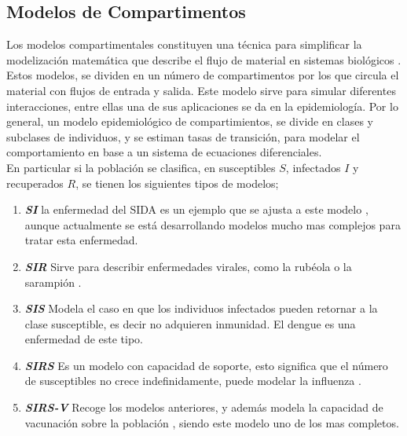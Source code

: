 \documentclass[journal]{IEEEtran}
\begin{document}
\subsection{Modelos de Compartimentos}\label{Modelos}
Los modelos compartimentales constituyen una técnica para simplificar la
modelización matemática que describe el flujo de material en sistemas
biológicos \cite{compartimientos}.
Estos modelos, se dividen en un número de compartimentos por los que circula el
material con flujos de entrada y salida. Este modelo
sirve para simular diferentes interacciones, entre ellas una de sus
aplicaciones se da en la epidemiología. Por lo general, un modelo
epidemiológico de compartimientos, se divide en clases y subclases de
individuos, y se estiman tasas de transición, para modelar el comportamiento
en base a un sistema de ecuaciones diferenciales.\\
\newline
En particular si la población se clasifica, en susceptibles $S$, infectados $I$
y recuperados $R$, se tienen los siguientes tipos de modelos;
\begin{enumerate}
  \item \textbf{\textit{SI}} la enfermedad del SIDA es un ejemplo que se
        ajusta a este modelo \cite{SIDA}, aunque actualmente se está desarrollando
        modelos mucho mas complejos para tratar esta enfermedad.
  \item \textbf{\textit{SIR}} Sirve para describir enfermedades virales,
        como la rubéola o la sarampión \cite{Rubeola}.
  \item \textbf{\textit{SIS}} Modela el caso en que los individuos
        infectados pueden retornar a la clase susceptible, es decir no adquieren
        inmunidad. El dengue \cite{Dengue} es una enfermedad de este tipo.
  \item \textbf{\textit{SIRS}} Es un modelo con capacidad de soporte,
        esto significa que el número de susceptibles no crece indefinidamente, puede
        modelar la influenza \cite{Influenza}.
  \item \textbf{\textit{SIRS-V}} Recoge los modelos anteriores, y además
        modela la capacidad de vacunación sobre la población \cite{Vacunacion}, siendo
        este modelo uno de los mas completos.
\end{enumerate}
\end{document}
